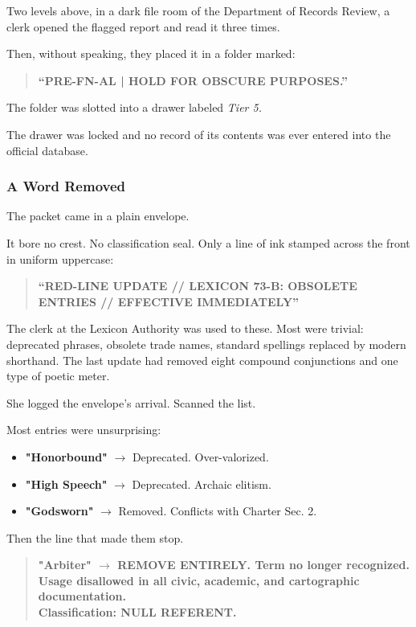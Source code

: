 \documentclass[12pt]{article}
\begin{document}
\vspace{1em}

Two levels above, in a dark file room of the Department of Records Review, a clerk opened the flagged report and read it three times.

Then, without speaking, they placed it in a folder marked:

\begin{quote}
\textbf{“PRE-FN-AL \quad | \quad HOLD FOR OBSCURE PURPOSES.”}
\end{quote}

The folder was slotted into a drawer labeled \textit{Tier 5.}

The drawer was locked and no record of its contents was ever entered into the official database.


\dotfill

\subsubsection*{A Word Removed}

The packet came in a plain envelope.

It bore no crest. No classification seal. Only a line of ink stamped across the front in uniform uppercase:

\begin{quote}
\textbf{“RED-LINE UPDATE // LEXICON 73-B: OBSOLETE ENTRIES // EFFECTIVE IMMEDIATELY”}
\end{quote}

The clerk at the Lexicon Authority was used to these. Most were trivial: deprecated phrases, obsolete trade names, standard spellings replaced by modern shorthand. The last update had removed eight compound conjunctions and one type of poetic meter.

She logged the envelope’s arrival. Scanned the list.

Most entries were unsurprising:
\begin{itemize}
    \item \textbf{"Honorbound"} $\rightarrow$ Deprecated. Over-valorized.
    \item \textbf{"High Speech"} $\rightarrow$ Deprecated. Archaic elitism.
    \item \textbf{"Godsworn"} $\rightarrow$ Removed. Conflicts with Charter Sec. 2.
\end{itemize}

Then the line that made them stop.

\begin{quote}
\textbf{"Arbiter" $\rightarrow$ REMOVE ENTIRELY. Term no longer recognized. Usage disallowed in all civic, academic, and cartographic documentation.} \\
\textbf{Classification: NULL REFERENT.}
\end{quote}
\end{document}

